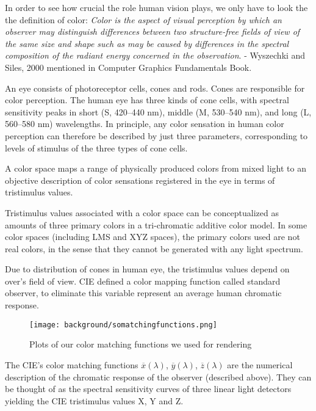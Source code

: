 \label{subsec:colors}
In order to see how crucial the role human vision plays, we only have to look the the definition of color: 
\textit{Color is the aspect of visual perception by which an observer may distinguish differences between two structure-free fields of view of the same size and shape such as may be caused by differences in the spectral composition of the radiant energy concerned in the observation}. -  Wyszechki and Siles, 2000 mentioned in Computer Graphics Fundamentals Book. 

An eye consists of photoreceptor cells, cones and rods. Cones are responsible for color perception. 
The human eye has three kinds of cone cells, with spectral sensitivity peaks in short (S, 420–440 nm), middle (M, 530–540 nm), and long (L, 560–580 nm) wavelengths.
In principle, any color sensation in human color perception can therefore be described by just three parameters, corresponding to levels of stimulus of the three types of cone cells.

A color space maps a range of physically produced colors from mixed light to an objective description of color
sensations registered in the eye in terms of tristimulus values.

Tristimulus values associated with a color space can be conceptualized as amounts of three primary colors in a tri-chromatic additive color model. In some color spaces (including LMS and XYZ spaces), the primary colors used are not real colors, in the sense that they cannot be generated with any light spectrum.

Due to distribution of cones in human eye, the tristimulus values depend on over's field of view. CIE defined a color mapping function called standard observer, to eliminate this variable represent an average human chromatic response.

\begin{figure}[H]
  \centering
  \texttt{[image: background/somatchingfunctions.png]}
  \label{fig:matchingfunction}
  \caption{Plots of our color matching functions we used for rendering}
\end{figure}

The CIE's color matching functions $\overline{x}(\lambda)$, $\overline{y}(\lambda)$, $\overline{z}(\lambda)$ are the numerical description of the chromatic response of the observer (described above). They can be thought of as the spectral sensitivity curves of three linear light detectors yielding the CIE tristimulus values X, Y and Z.

